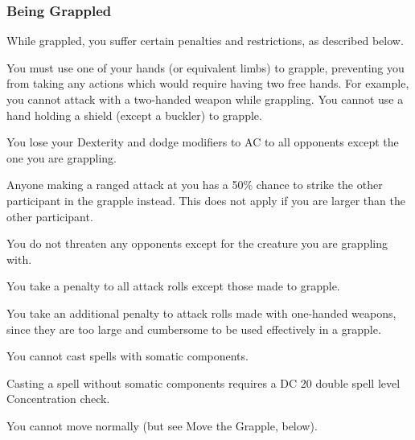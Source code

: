 \subsubsection{Being Grappled}
While grappled, you suffer certain penalties and restrictions, as described below.
\begin{itemize*}
\item You must use one of your hands (or equivalent limbs) to grapple, preventing you from taking any actions which would require having two free hands. For example, you cannot attack with a two-handed weapon while grappling. You cannot use a hand holding a shield (except a buckler) to grapple.
\item You lose your Dexterity and dodge modifiers to AC to all opponents except the one you are grappling.
\item Anyone making a ranged attack at you has a 50\% chance to strike the other participant in the grapple instead. This does not apply if you are larger than the other participant.
\item You do not threaten any opponents except for the creature you are grappling with.
\item You take a  penalty to all attack rolls except those made to grapple.
\item You take an additional  penalty to attack rolls made with one-handed weapons, since they are too large and cumbersome to be used effectively in a grapple.
\item You cannot cast spells with somatic components.
\item Casting a spell without somatic components requires a DC 20 \add double spell level Concentration check.
\item You cannot move normally (but see Move the Grapple, below).
\end{itemize*}

